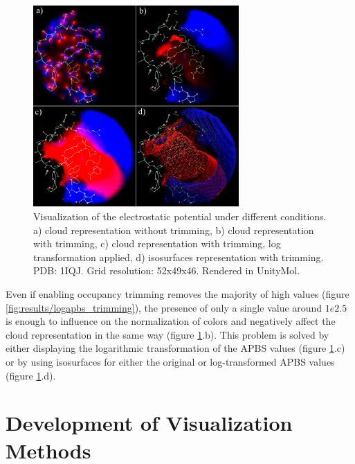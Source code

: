     \begin{figure}[H]
      \centering
      \includegraphics[width=0.7\textwidth]{figures/results/apbs_christmas.png}
      \caption{\label{fig:results/apbs_christmas} Visualization of the electrostatic potential under different conditions. a) cloud representation without trimming, b) cloud representation with trimming, c) cloud representation with trimming, log transformation applied, d) isosurfaces representation with trimming. PDB: 1IQJ. Grid resolution: 52x49x46. Rendered in UnityMol.}
    \end{figure}

    Even if enabling occupancy trimming removes the majority of high values (figure \ref{fig:results/logapbs_trimming}), the presence of only a single value around $1e2.5$ is enough to influence on the normalization of colors and negatively affect the cloud representation in the same way (figure \ref{fig:results/apbs_christmas}.b). This problem is solved by either displaying the logarithmic transformation of the APBS values (figure \ref{fig:results/apbs_christmas}.c) or by using isosurfaces for either the original or log-transformed APBS values (figure \ref{fig:results/apbs_christmas}.d).


\section{Development of Visualization Methods}
